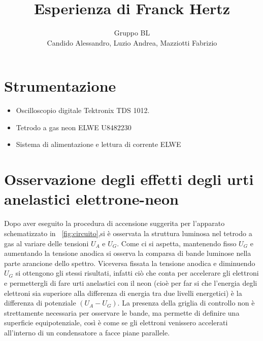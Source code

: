 \documentclass[10pt,a4paper]{article}
\title{Esperienza di Franck Hertz}
\author{Gruppo BL \\ Candido Alessandro, Luzio Andrea, Mazziotti Fabrizio}
\begin{document}
\maketitle

\section{Strumentazione }%
\begin{itemize}
 \item Oscilloscopio digitale Tektronix TDS 1012.
 \item Tetrodo a gas neon ELWE U8482230
 \item Sistema di alimentazione e lettura di corrente ELWE

\end{itemize}

\section{Osservazione degli effetti degli urti anelastici elettrone-neon}

Dopo aver eseguito la procedura di accensione suggerita per l'apparato schematizzato in \figurename{~\ref{fig:circuito}},si è osservata la struttura luminosa nel tetrodo a gas al variare delle tensioni $U_{A}$ e $U_{G}$.
Come ci si aspetta, mantenendo fisso $U_{G}$ e aumentando la tensione anodica si osserva la comparsa di bande luminose nella parte arancione dello spettro.
Viceversa fissata la tensione anodica e diminuendo $U_{G}$ si ottengono gli stessi risultati, infatti ciò che conta per accelerare gli elettroni e permettergli di fare urti anelastici con il neon (cioè per far si che l'energia degli elettroni sia superiore alla differenza di energia tra due livelli energetici) è la differenza di potenziale $(U_{A}-U_{G})$.
La presenza della griglia di controllo non è strettamente necessaria per osservare le bande, ma permette di definire una superficie equipotenziale, così è come se gli elettroni venissero accelerati all'interno di un condensatore a facce piane parallele.
\end{document}
